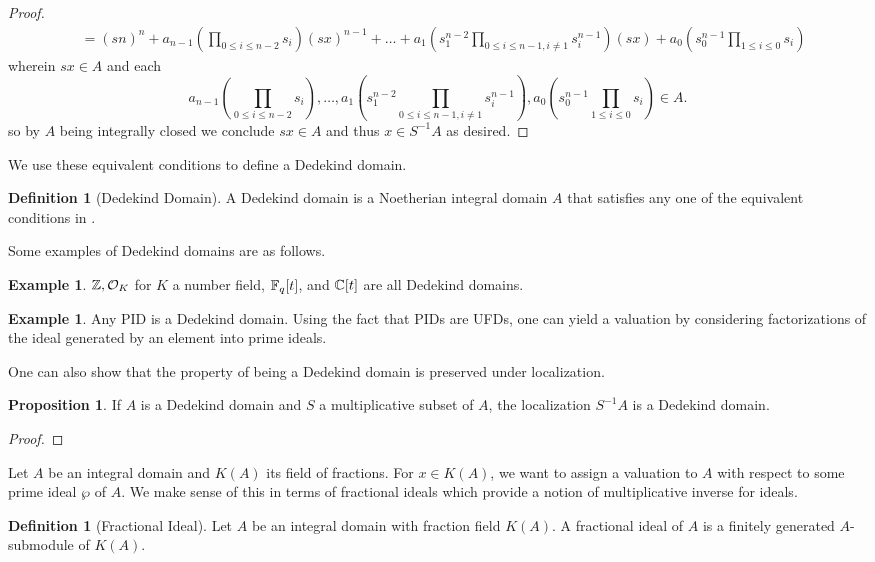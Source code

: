 \documentclass{amsart}
\theoremstyle{definition}
\newtheorem{example}[theorem]{Example}
\newtheorem{proposition}[theorem]{Proposition}
\newtheorem{definition}[theorem]{Definition}
\numberwithin{equation}{section}
\begin{document}
\begin{proof}
\begin{align*}
    &= (sn)^{n} + a_{n-1}\left(\prod_{0\leq i\leq n-2}s_{i}\right)(sx)^{n-1}+\dots+a_{1}\left(s_{1}^{n-2}\prod_{0\leq i\leq n-1, i\neq 1}s_{i}^{n-1}\right)(sx)+a_{0}\left(s_{0}^{n-1}\prod_{1\leq i\leq 0}s_{i}\right)
  \end{align*}
  \normalsize
  wherein $sx\in A$ and each 
  \small
  $$a_{n-1}\left(\prod_{0\leq i\leq n-2}s_{i}\right), \dots, a_{1}\left(s_{1}^{n-2}\prod_{0\leq i\leq n-1, i\neq 1}s_{i}^{n-1}\right), a_{0}\left(s_{0}^{n-1}\prod_{1\leq i\leq 0}s_{i}\right)\in A.$$
  \normalsize
  so by $A$ being integrally closed we conclude $sx\in A$ and thus $x\in S^{-1}A$ as desired. 
\end{proof}
We use these equivalent conditions to define a Dedekind domain. 
\begin{definition}[Dedekind Domain]
  A Dedekind domain is a Noetherian integral domain $A$ that satisfies any one of the equivalent conditions in . 
\end{definition}
Some examples of Dedekind domains are as follows. 
\begin{example}
  $\mathbb{Z}, \mathcal{O}_{K}$ for $K$ a number field, $\mathbb{F}_{q}[t]$, and $\mathbb{C}[t]$ are all Dedekind domains. 
\end{example}
\begin{example}
  Any PID is a Dedekind domain. Using the fact that PIDs are UFDs, one can yield a valuation by considering factorizations of the ideal generated by an element into prime ideals. 
\end{example}
One can also show that the property of being a Dedekind domain is preserved under localization. 
\begin{proposition}
  If $A$ is a Dedekind domain and $S$ a multiplicative subset of $A$, the localization $S^{-1}A$ is a Dedekind domain. 
\end{proposition}
\begin{proof}
  
\end{proof}
Let $A$ be an integral domain and $K(A)$ its field of fractions. For $x\in K(A)$, we want to assign a valuation to $A$ with respect to some prime ideal $\wp$ of $A$. We make sense of this in terms of fractional ideals which provide a notion of multiplicative inverse for ideals. 
\begin{definition}[Fractional Ideal]
  Let $A$ be an integral domain with fraction field $K(A)$. A fractional ideal of $A$ is a finitely generated $A$-submodule of $K(A)$. 
\end{definition}
\end{document}
